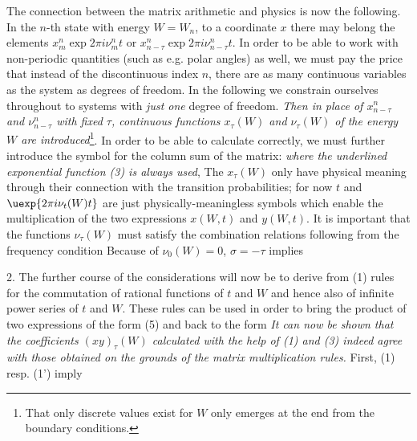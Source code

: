 The connection between the matrix arithmetic and physics is now the following. In the $n$-th state with energy $W=W_n$, to a coordinate $x$ there may belong the elements $x_m^n\exp{2\pi i\nu_m^n t}$ or $x_{n-\tau}^n\exp{2\pi i \nu_{n-\tau}^n t}$. In order to be able to work with non-periodic quantities (such as e.g. polar angles) as well, we must pay the price that instead of the discontinuous index $n$, there are as many continuous variables as the system as degrees of freedom. In the following we constrain ourselves throughout to systems with \textit{just one} degree of freedom. \textit{Then in place of $x_{n-\tau}^n$ and $\nu_{n-\tau}^n$ with fixed $\tau$, continuous functions $x_\tau(W)$ and $\nu_\tau(W)$ of the energy $W$ are introduced}\footnote{That only discrete values exist for $W$ only emerges at the end from the boundary conditions.}. In order to be able to calculate correctly, we must further introduce the symbol for the column sum of the matrix:
\textit{where the underlined exponential function (3) is always used},  The $x_\tau(W)$ only have physical meaning through their connection with the transition probabilities; for now $t$ and $\uexp{2\pi i \nu_t(W)t}$ are just physically-meaningless symbols which enable the multiplication of the two expressions $x(W, t)$ and $y(W, t)$. It is important that the functions $\nu_\tau(W)$ must satisfy the combination relations following from the frequency condition
Because of $\nu_0(W) = 0$, $\sigma = -\tau$ implies

2. The further course of the considerations will now be to derive from (1) rules for the commutation of rational functions of $t$ and $W$ and hence also of infinite power series of $t$ and $W$. These rules can be used in order to bring the product of two expressions of the form (5)
and
back to the form
\textit{It can now be shown that the coefficients $(xy)_\tau(W)$ calculated with the help of (1) and (3) indeed agree with those obtained on the grounds of the matrix multiplication rules.} First, (1) resp. (1') imply

